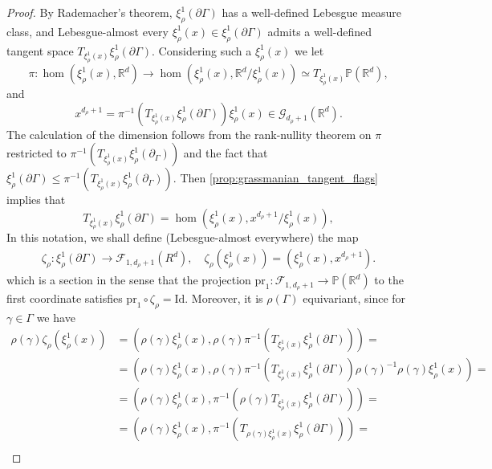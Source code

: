 \documentclass{report}
\begin{document}
\begin{proof}
    By Rademacher's theorem, $\xi^1_\rho(\partial \Gamma)$ has a well-defined Lebesgue measure class, and Lebesgue-almost every $\xi^1_\rho(x) \in \xi^1_\rho(\partial \Gamma)$ admits a well-defined tangent space $T_{\xi^1_\rho(x)} \xi^1_\rho(\partial \Gamma)$.
    Considering such a $\xi^1_\rho(x)$ we let
    \[
        \pi : \hom(\xi^1_\rho(x), \mathbb R^d) \to \hom(\xi^1_\rho(x), \mathbb R^d/\xi^1_\rho(x)) \simeq T_{\xi^1_\rho(x)} \mathbb P(\mathbb R^d),
    \]
    and
    \[
        x^{d_\rho + 1} = \pi^{-1} (T_{\xi^1_\rho(x)} \xi^1_\rho(\partial \Gamma)) \xi^1_\rho(x) \in 
        \mathcal G_{d_\rho + 1} (\mathbb R^d).
    \]
    The calculation of the dimension follows from the rank-nullity theorem on 
    $\pi$ restricted to  $\pi^{-1}(T_{\xi_\rho^1(x)} \xi_\rho^1(\partial_\Gamma))$ 
    and the fact that  
    $\xi_\rho^1(\partial \Gamma) \leq \pi^{-1}(T_{\xi_\rho^1(x)} \xi_\rho^1(\partial_\Gamma)) $. 
    Then \cref{prop:grassmanian_tangent_flags} implies that
    \[
        T_{\xi^1_\rho(x)} \xi^1_\rho(\partial \Gamma) = 
        \hom(\xi^1_\rho(x), x^{d_\rho + 1} / \xi^1_\rho(x)),
    \]
    In this notation, we shall define (Lebesgue-almost everywhere) the map
    \begin{align*}
        \zeta_\rho: \xi_\rho^1(\partial \Gamma) \to \mathcal F_{1, d_\rho + 1} (R^d), \quad 
        \zeta_\rho(\xi_\rho^1(x)) = (\xi_\rho^1(x), x^{d_\rho + 1}).
    \end{align*}
    which is a section in the sense that the projection $\mathrm{pr}_1: \mathcal F_{1, d_\rho + 1} \to \mathbb P(\mathbb R^d)$ to the first coordinate satisfies $\mathrm{pr}_1 \circ \zeta_\rho = \mathrm{Id}$.
    Moreover, it is $\rho(\Gamma)$ equivariant, since for $\gamma \in \Gamma$ we have
    \begin{align*}
        \rho(\gamma) \zeta_\rho(\xi_\rho^1(x)) &=
         \left( \rho(\gamma) \xi_\rho^1(x), 
            \rho(\gamma) \pi^{-1}(T_{\xi_\rho^1(x)} \xi_\rho^1(\partial \Gamma)) \right) =\\
        &= \left( \rho(\gamma) \xi_\rho^1(x), 
        \rho(\gamma) \pi^{-1}(T_{\xi_\rho^1(x)} \xi_\rho^1(\partial \Gamma)) \rho(\gamma)^{-1} \rho(\gamma) \xi_\rho^1(x) \right) =\\
        &= \left( \rho(\gamma) \xi_\rho^1(x), 
           \pi^{-1}(\rho(\gamma) T_{\xi_\rho^1(x)} \xi_\rho^1(\partial \Gamma)) \right) =\\
        &= \left( \rho(\gamma) \xi_\rho^1(x), 
        \pi^{-1}(T_{\rho(\gamma) \xi_\rho^1(x)} \xi_\rho^1(\partial \Gamma)) \right) =\\

\end{align*}
\end{proof}
\end{document}

